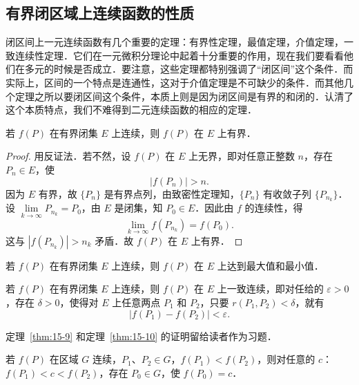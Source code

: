 \subsection{有界闭区域上连续函数的性质}

闭区间上一元连续函数有几个重要的定理：有界性定理，最值定理，介值定理，一致连续性定理．它们在一元微积分理论中起着十分重要的作用，现在我们要看看他们在多元的时候是否成立．要注意，这些定理都特别强调了“闭区间”这个条件．而实际上，区间的一个特点是连通性，这对于介值定理是不可缺少的条件．而其他几个定理之所以要闭区间这个条件，本质上则是因为闭区间是有界的和闭的．认清了这个本质特点，我们不难得到二元连续函数的相应的定理．

\begin{theorem}[有界性定理]\label{thm:15-8}
若 $f(P)$ 在有界闭集 $E$ 上连续，则 $f(P)$ 在 $E$ 上有界．
\end{theorem}

\begin{proof}
用反证法．若不然，设 $f(P)$ 在 $E$ 上无界，即对任意正整数 $n$，存在 $P_{n}\in E$，使
\[
\left|f\left(P_{n}\right)\right|>n.
\]
因为 $E$ 有界，故 $\{P_{n}\}$ 是有界点列，由致密性定理知，$\{P_{n}\}$ 有收敛子列 $\{P_{n_{k}}\}$．设 $\lim\limits_{k\to\infty}P_{n_{k}}=P_{0}$，由 $E$ 是闭集，知 $P_{0}\in E$．因此由 $f$ 的连续性，得
\[
\lim_{k\to\infty}f(P_{n_{k}})=f(P_{0}).
\]
这与 $\left|f\left(P_{n_{k}}\right)\right|>n_{k}$ 矛盾．故 $f(P)$ 在 $E$ 上有界．
\end{proof}

\begin{theorem}[最值定理]\label{thm:15-9}
若 $f(P)$ 在有界闭集 $E$ 上连续，则 $f(P)$ 在 $E$ 上达到最大值和最小值．
\end{theorem}

\begin{theorem}[一致连续性定理]\label{thm:15-10}
若 $f(P)$ 在有界闭集 $E$ 上连续，则 $f(P)$ 在 $E$ 上一致连续，即对任给的 $\varepsilon>0$，存在 $\delta>0$，使得对 $E$ 上任意两点 $P_{1}$ 和 $P_{2}$，只要 $r(P_{1},P_{2})<\delta$，就有
\[
\left|f(P_{1})-f(P_{2})\right|<\varepsilon.
\]
\end{theorem}

定理~\ref{thm:15-9} 和定理~\ref{thm:15-10} 的证明留给读者作为习题．

\begin{theorem}[介值定理]\label{thm:15-11}
若 $f(P)$ 在区域 $G$ 连续，$P_{1}$、$P_{2}\in G$，$f(P_{1})<f(P_{2})$，则对任意的 $c$：$f(P_{1})<c<f(P_{2})$，存在 $P_{0}\in G$，使 $f(P_{0})=c$．
\end{theorem}


